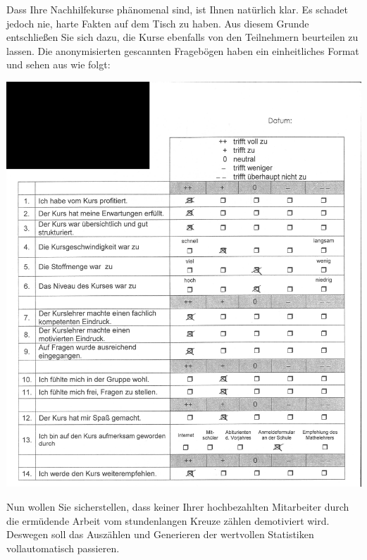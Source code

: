 \vspace{-1.5em}

Dass Ihre Nachhilfekurse phänomenal sind, ist Ihnen natürlich klar. Es schadet jedoch nie, harte Fakten auf dem Tisch zu haben. 
Aus diesem Grunde entschließen Sie sich dazu, die Kurse ebenfalls von den Teilnehmern beurteilen zu lassen. 
Die anonymisierten gescannten Fragebögen haben ein einheitliches Format und sehen aus wie folgt:\\
\begin{center}
\includegraphics[scale=0.09]{bilder/bogen_example.jpg}
\end{center}

Nun wollen Sie sicherstellen, dass keiner Ihrer hochbezahlten Mitarbeiter durch die ermüdende Arbeit vom stundenlangen Kreuze zählen demotiviert wird. 
Deswegen soll das Auszählen und Generieren der wertvollen Statistiken vollautomatisch passieren.

